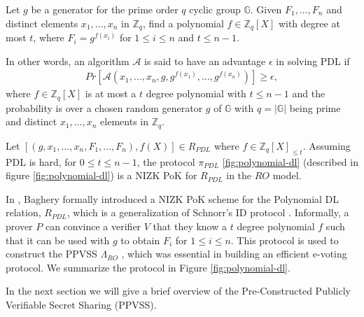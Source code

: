 \begin{definition}
  Let $g$ be a generator for the prime order $q$ cyclic group $\mathbb{G}$. Given $F_1,\dots,F_n$ and distinct elements $x_1,\dots,x_n$ in 
  $\mathbb{Z}_q$, find a polynomial $f\in\mathbb{Z}_q[X]$ with degree at most $t$, where $F_i=g^{f(x_i)}$ 
  for $1\leq i\leq n$ and $t\leq n-1$.\par

  In other words, an algorithm $\mathcal{A}$ is said to have an advantage $\epsilon$ in solving PDL if 
  \begin{align*}
    Pr[\mathcal{A}(x_1,\dots,x_n,g,g^{f(x_1)},\dots,g^{f(x_n)})]\geq\epsilon,
  \end{align*}
  where $f\in\mathbb{Z}_q[X]$ is at most a $t$ degree polynomial with $t\leq n-1$ and the probability is over a 
  chosen random generator $g$ of $\mathbb{G}$ with $q=|\mathbb{G}|$ being prime and distinct $x_1,\dots,x_n$ 
  elements in $\mathbb{Z}_q$.
\end{definition}

\begin{theorem}\cite{cryptoeprint:2023/1669}\label{th:PDL security}
  Let $[(g,x_1,\dots,x_n,F_1,\dots,F_n),f(X)]\in R_{PDL}$ where $f\in\mathbb{Z}_q[X]_{\leq t}$. 
  Assuming PDL is hard, for $0\leq t\leq n-1$, the protocol $\pi_{PDL}$ \ref{fig:polynomial-dl} (described in figure \ref{fig:polynomial-dl}) 
  is a NIZK PoK for $R_{PDL}$ in the $RO$ model.
\end{theorem}

In \cite{cryptoeprint:2023/1669}, Baghery formally introduced a NIZK PoK scheme for the Polynomial DL 
relation, $R_{PDL}$, which is a generalization of Schnorr's ID protocol \cite{crypto-1989-1727}. Informally, 
a prover $P$ can convince a verifier $V$ that they know a $t$ degree polynomial $f$ such that 
it can be used with $g$ to obtain $F_i$ for $1\leq i\leq n$. This protocol is used to construct the PPVSS 
$\Lambda_{RO}$ \cite{cryptoeprint:2025/576}, which was essential in building an efficient e-voting protocol. 
We summarize the protocol in Figure \ref{fig:polynomial-dl}.


In the next section we will give a brief overview of the Pre-Constructed Publicly Verifiable Secret Sharing 
(PPVSS).

